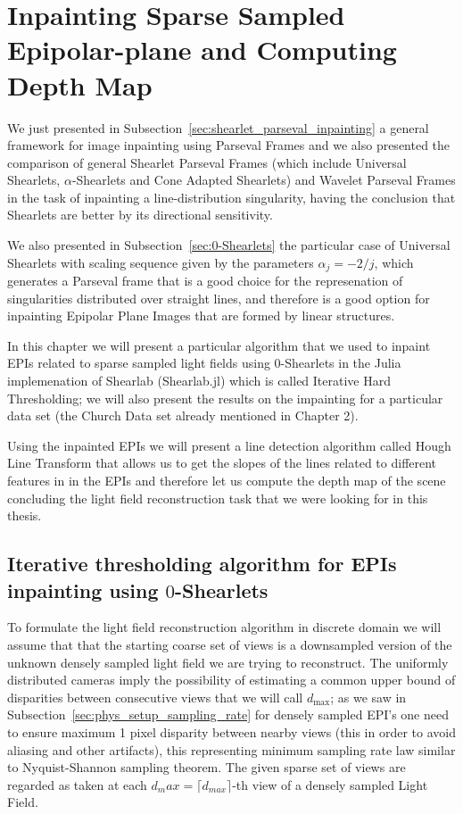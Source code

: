 \chapter{Inpainting Sparse Sampled Epipolar-plane and Computing Depth Map}
\label{chap:Inpainting_sparse}

We just presented in Subsection~\ref{sec:shearlet_parseval_inpainting} a general framework for image inpainting using Parseval Frames and we also presented the comparison of general Shearlet Parseval Frames (which include Universal Shearlets, $\alpha$-Shearlets and Cone Adapted Shearlets) and Wavelet Parseval Frames in the task of inpainting a line-distribution singularity, having the conclusion that Shearlets are better by its directional sensitivity.

\bigskip

We also presented in Subsection~\ref{sec:0-Shearlets} the particular case of Universal Shearlets with scaling sequence given by the parameters $\alpha_j=-2/j$, which generates a Parseval frame that is a good choice for the represenation of singularities distributed over straight lines, and therefore is a good option for inpainting Epipolar Plane Images that are formed by linear structures.

\bigskip

In this chapter we will present a particular algorithm that we used to inpaint EPIs related to sparse sampled light fields using $0$-Shearlets in the Julia implemenation of Shearlab (Shearlab.jl) which is called Iterative Hard Thresholding; we will also present the results on the impainting for a particular data set (the Church Data set already mentioned in Chapter 2). 

\bigskip

Using the inpainted EPIs we will present a line detection algorithm called Hough Line Transform that allows us to get the slopes of the lines related to different features in in the EPIs and therefore let us compute the depth map of the scene concluding the light field reconstruction task that we were looking for in this thesis. 

\section{Iterative thresholding algorithm for EPIs inpainting using $0$-Shearlets}

To formulate the light field reconstruction algorithm in discrete domain we will assume that that the starting coarse set of views is a downsampled version of the unknown densely sampled light field we are trying to reconstruct. The uniformly distributed cameras imply the possibility of estimating a common upper bound of disparities between consecutive views that we will call $d_{\text{max}}$; as we saw in Subsection~\ref{sec:phys_setup_sampling_rate} for densely sampled EPI's one need to ensure maximum 1 pixel disparity between nearby views (this in order to avoid aliasing and other artifacts), this representing minimum sampling rate law similar to Nyquist-Shannon sampling theorem. The given sparse set of views are regarded as taken at each $d_max=\lceil d_{max}\rceil$-th view of a densely sampled Light Field. 

